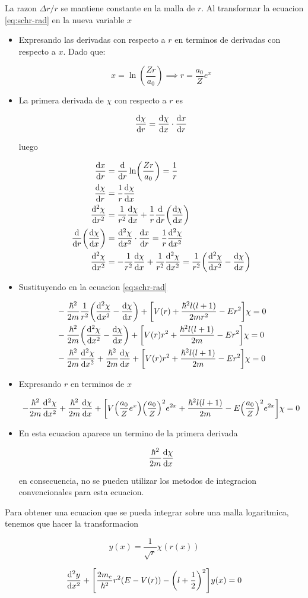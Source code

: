 \documentclass[11pt]{article}
\begin{document}
La razon \(\Delta r / r\) se mantiene constante en la malla de \(r\). Al transformar la ecuacion \ref{eq:schr-rad} en la nueva variable \(x\)

\begin{itemize}
\item Expresando las derivadas con respecto a \(r\) en terminos de derivadas con respecto a \(x\). Dado que:

\[ x = \ln(\frac{Zr}{a_0}) \implies r = \frac{a_0}{Z}e^x \]

\item La primera derivada de \(\chi\) con respecto a \(r\) es

\[ \dv{\chi}{r} = \dv{\chi}{x}\cdot \dv{x}{r} \]

luego

\begin{align*}
    \dv{x}{r} &= \dv{r}\ln(\frac{Zr}{a_0}) = \frac{1}{r} \\
    \dv{\chi}{r} &= \frac{1}{r} \dv{\chi}{x} \\
    \dv[2]{\chi}{r} &= \frac{1}{r^2} \dv{\chi}{x} + \frac{1}{r}\dv{r}(\dv{\chi}{x}) \\
    \dv{r}(\dv{\chi}{x}) &= \dv[2]{\chi}{x} \cdot \dv{x}{r} = \frac{1}{r} \dv[2]{\chi}{x} \\
    \dv[2]{\chi}{x} &= - \frac{1}{r^2}\dv{\chi}{x} + \frac{1}{r^2}\dv[2]{\chi}{x} = \frac{1}{r^2}\qty(\dv[2]{\chi}{x} - \dv{\chi}{x})
\end{align*}

\item Sustituyendo en la ecuacion \ref{eq:schr-rad}

\begin{align*}
&- \frac{\hbar^2}{2m} \frac{1}{r^2} \qty(\dv[2]{\chi}{x}-\dv{\chi}{x}) + \qty[V(r) + \frac{\hbar^2 l(l+1)}{2mr^2} - E r^2]\chi = 0 \\
&- \frac{\hbar^2}{2m}\qty(\dv[2]{\chi}{x}-\dv{\chi}{x}) + \qty[V(r) r^2 + \frac{\hbar^2 l(l+1)}{2m} - E r^2]\chi = 0 \\
&- \frac{\hbar^2}{2m}\dv[2]{\chi}{x} + \frac{\hbar^2}{2m}\dv{\chi}{x} + \qty[V(r)r^2 + \frac{\hbar^2 l(l+1)}{2m}-Er^2]\chi = 0
\end{align*}

\item Expresando \(r\) en terminos de \(x\)

\[ - \frac{\hbar^2}{2m}\dv[2]{\chi}{x} + \frac{\hbar^2}{2m}\dv{\chi}{x} + \qty[V\qty(\frac{a_0}{Z}e^x)\qty(\frac{a_0}{Z})^2 e^{2x} + \frac{\hbar^2l(l+1)}{2m}- E\qty(\frac{a_0}{Z})^2e^{2x}]\chi = 0 \]

\item En esta ecuacion aparece un termino de la primera derivada

\[ \frac{\hbar^2}{2m} \dv{\chi}{x} \]

en consecuencia, no se pueden utilizar los metodos de integracion convencionales para esta ecuacion.
\end{itemize}

Para obtener una ecuacion que se pueda integrar sobre una malla logaritmica, tenemos que hacer la transformacion

\[ y(x) = \frac{1}{\sqrt{r}}\chi(r(x)) \]

\[ \dv[2]{y}{x} + \qty[\frac{2m_e}{\hbar^2}r^2(E-V(r)) - \qty(l + \frac{1}{2})^2]y(x) = 0 \]
\end{document}
